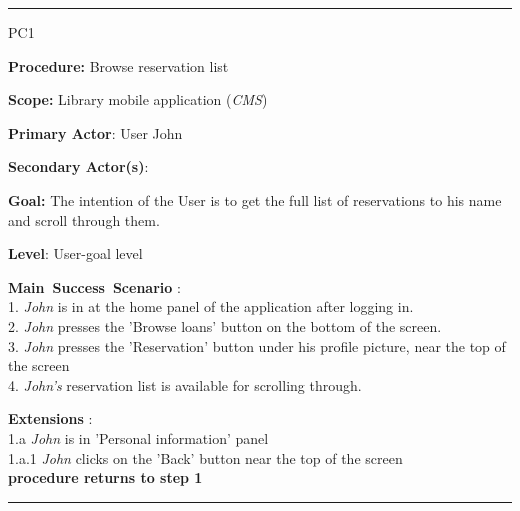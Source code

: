 \vspace{0.5cm}
\hrule
\begin{lyxlist}{PC1}
\small{
\item [\textbf{Procedure:}] Browse reservation list
\item [\textbf{Scope:}] Library mobile application (\emph{CMS})
\item [\textbf{Primary Actor}:] User John
\item [\textbf{Secondary Actor(s)}:] 
\item [\textbf{Goal:}] The intention of the User is to get the full list of
reservations to his name and scroll through them.
\item [\textbf{Level}:] User-goal level
\item [\textbf{Main~Success~Scenario}]:\\
1. \emph{John} is in at the home panel of the application after logging in.\\
2. \emph{John} presses the 'Browse loans' button on the bottom of the screen.\\
3. \emph{John} presses the 'Reservation' button under his profile picture, near
the top of the screen\\
4. \emph{John's} reservation list is available for scrolling
through.\\

\item [\textbf{Extensions}]:\\
1.a \emph{John} is in 'Personal information' panel\\
\hspace*{0.5cm} 1.a.1 \emph{John} clicks on the 'Back' button near the top of
the screen\\
\hspace*{0.5cm} \textbf{procedure returns to step 1}

}

\end{lyxlist}
\hrule


